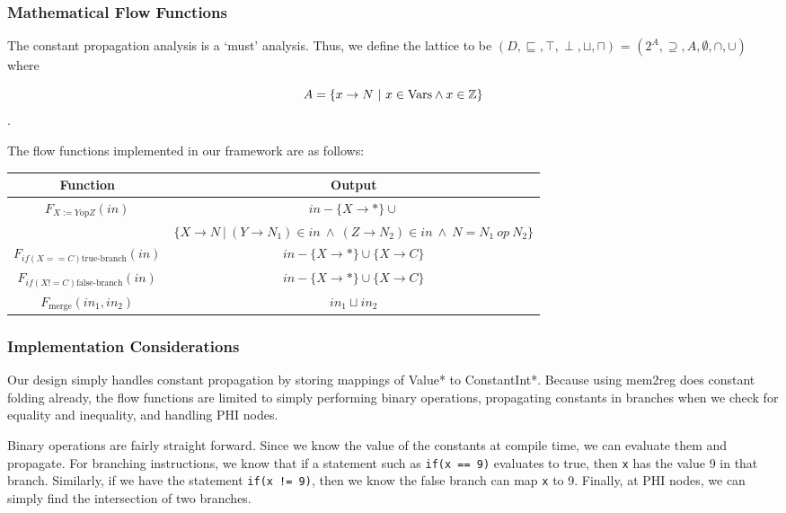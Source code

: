 \documentclass{article}
\theoremstyle{definition}
\begin{document}
\subsubsection{Mathematical Flow Functions}

The constant propagation analysis is a `must' analysis. Thus, we define the lattice to be $(D, \sqsubseteq, \top, \perp, \sqcup, \sqcap)$ = $(2^A, \supseteq, A, \emptyset, \cap, \cup)$ where

\[ A = \{x \rightarrow N~|~x \in \textup{Vars} \wedge x \in \mathbb{Z}\} \].

The flow functions implemented in our framework are as follows:

\begin{center}
\begin{tabular}{c | c} %
Function & Output \\ [0.5ex] %
\hline %
$F_{X:= Y \text{op} Z}(in)$ & $in - \{X \rightarrow \ast\} \cup$\\
& $\{ X \rightarrow N~|~(Y \rightarrow N_1) \in in~\wedge ~(Z \rightarrow N_2) \in in~\wedge ~N = N_1~op~N_2 \}$ \\ %
$F_{if(X == C) \text{true-branch}}(in)$ & $in - \{X \rightarrow \ast\} \cup \{ X \rightarrow C \}$ \\ 
$F_{if(X != C) \text{false-branch}}(in)$ & $in - \{X \rightarrow \ast\} \cup \{ X \rightarrow C \}$ \\ 
$F_{\text{merge}}(in_1, in_2)$ & $in_1 \sqcup in_2$\\
 [1ex] %
\hline %
\end{tabular} 
\end{center}

\subsubsection{Implementation Considerations}

Our design simply handles constant propagation by storing mappings of Value* to ConstantInt*. Because using mem2reg does constant folding already, the flow functions are limited to simply performing binary operations, propagating constants in branches when we check for equality and inequality, and handling PHI nodes.

Binary operations are fairly straight forward. Since we know the value of the constants at compile time, we can evaluate them and propagate. For branching instructions, we know that if a statement such as \verb|if(x == 9)| evaluates to true, then \verb|x| has the value 9 in that branch. Similarly, if we have the statement \verb|if(x != 9)|, then we know the false branch can map \verb|x| to 9. Finally, at PHI nodes, we can simply find the intersection of two branches.
\end{document}
